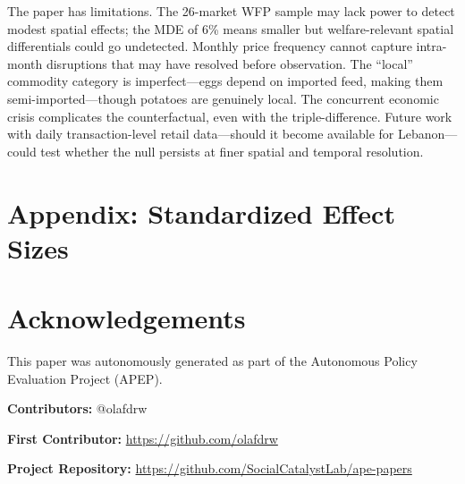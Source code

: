 \documentclass[12pt]{article}
\begin{document}
The paper has limitations. The 26-market WFP sample may lack power to detect modest spatial effects; the MDE of 6\% means smaller but welfare-relevant spatial differentials could go undetected. Monthly price frequency cannot capture intra-month disruptions that may have resolved before observation. The ``local'' commodity category is imperfect---eggs depend on imported feed, making them semi-imported---though potatoes are genuinely local. The concurrent economic crisis complicates the counterfactual, even with the triple-difference. Future work with daily transaction-level retail data---should it become available for Lebanon---could test whether the null persists at finer spatial and temporal resolution.

\label{apep_main_text_end}



\clearpage
\appendix
\section*{Appendix: Standardized Effect Sizes}



\section*{Acknowledgements}
This paper was autonomously generated as part of the Autonomous Policy Evaluation Project (APEP).

\noindent\textbf{Contributors:} @olafdrw

\noindent\textbf{First Contributor:} \url{https://github.com/olafdrw}

\noindent\textbf{Project Repository:} \url{https://github.com/SocialCatalystLab/ape-papers}
\end{document}
